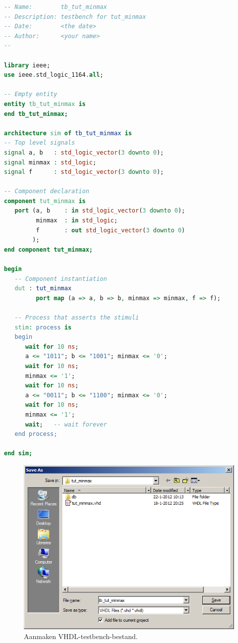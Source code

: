 \documentclass[a4paper,12pt,fleqn,twoside]{book}
\def\tutpicscale{0.455}
\begin{document}
\begin{lstlisting}[language=VHDL,caption=VHDL-testbench,label=cod:vhdltestbench,float=p,numbers=none]
-- Name:        tb_tut_minmax
-- Description: testbench for tut_minmax
-- Date:        <the date>
-- Author:      <your name>
--

library ieee;
use ieee.std_logic_1164.all;

-- Empty entity
entity tb_tut_minmax is
end tb_tut_minmax;

architecture sim of tb_tut_minmax is
-- Top level signals
signal a, b   : std_logic_vector(3 downto 0);
signal minmax : std_logic;
signal f      : std_logic_vector(3 downto 0);

-- Component declaration
component tut_minmax is
   port (a, b    : in std_logic_vector(3 downto 0);
         minmax  : in std_logic;
         f       : out std_logic_vector(3 downto 0)
        );
end component tut_minmax;

begin
   -- Component instantiation
   dut : tut_minmax 
         port map (a => a, b => b, minmax => minmax, f => f);

   -- Process that asserts the stimuli
   stim: process is
   begin
      wait for 10 ns;
      a <= "1011"; b <= "1001"; minmax <= '0';
      wait for 10 ns;
      minmax <= '1';
      wait for 10 ns;
      a <= "0011"; b <= "1100"; minmax <= '0';
      wait for 10 ns;
      minmax <= '1';
      wait;   -- wait forever
   end process;
	
end sim;
\end{lstlisting}

\begin{figure}[H]
\centering
\includegraphics[scale=\tutpicscale]{062savefile.png}
\caption{Aanmaken VHDL-testbench-bestand.}
\label{fig:062savefile}
\end{figure}
 
\end{document}
